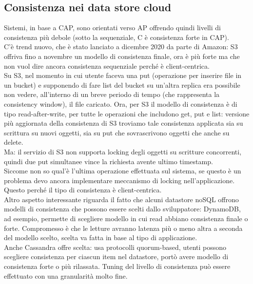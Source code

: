 \documentclass{article}
\begin{document}
\subsection{Consistenza nei data store cloud}
Sistemi, in base a CAP, sono orientati verso AP offrendo quindi livelli di consistenza più debole (sotto la sequenziale, C è consistenza forte in CAP).\\ C'è trend nuovo, che è stato lanciato a dicembre 2020 da parte di Amazon: S3 offriva fino a novembre un modello di consistenza finale, ora è più forte ma che non vuol dire ancora consistenza sequenziale perché è client-centrica.\\ Su S3, nel momento in cui utente faceva una put (operazione per inserire file in un bucket) e supponendo di fare list del bucket su un'altra replica era possibile non vedere, all'interno di un breve periodo di tempo (che rappresenta la consistency window), il file caricato. Ora, per S3 il modello di consistenza è di tipo read-after-write, per tutte le operazioni che includono get, put e list: versione più aggiornata della consistenza di S3 troviamo tale consistenza applicata sia su scrittura su nuovi oggetti, sia su put che sovrascrivono oggetti che anche su delete.\\ Ma: il servizio di S3 non supporta locking degli oggetti su scritture concorrenti, quindi due put simultanee vince la richiesta avente ultimo timestamp.\\ Siccome non so qual'è l'ultima operazione effettuata sul sistema, se questo è un problema devo ancora implementare meccanismo di locking nell'applicazione. Questo perché il tipo di consistenza è client-centrica.\\ Altro aspetto interessante riguarda il fatto che alcuni datastore noSQL offrono modelli di consistenza che possono essere scelti dallo sviluppatore: DynamoDB, ad esempio, permette di scegliere modello in cui read abbiano consistenza finale o forte. Compromesso è che le letture avranno latenza più o meno altra a seconda del modello scelto, scelta va fatta in base al tipo di applicazione.\\ Anche Cassandra offre scelta: usa protocolli quorum-based, utenti possono scegliere consistenza per ciascun item nel datastore, portò avere modello di consistenza forte o più rilassata. Tuning del livello di consistenza può essere effettuato con una granularità molto fine.
\end{document}
